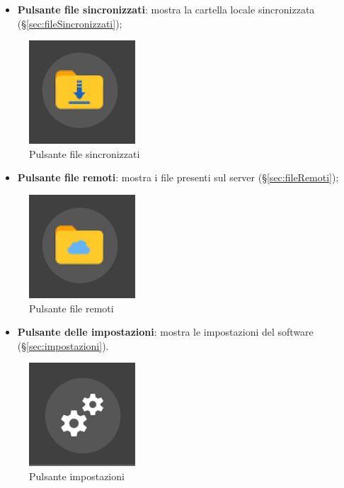 \begin{itemize}
\item \textbf{Pulsante file sincronizzati}: mostra la cartella locale sincronizzata (\S{}\ref{sec:fileSincronizzati}); \
\end{itemize}

\begin{figure}[H]
    \centering
    \includegraphics[scale = 1]{components/img/pulsanteFileS.png}
    \caption{Pulsante file sincronizzati}
    \label{fig:fileSync}
\end{figure}

\begin{itemize}
\item \textbf{Pulsante file remoti}: mostra i file presenti sul server (\S{}\ref{sec:fileRemoti}); \
\end{itemize}

\begin{figure}[H]
    \centering
    \includegraphics[scale = 1]{components/img/pulsanteFileR.png}
    \caption{Pulsante file remoti}
    \label{fig:fileRem}
\end{figure}

\begin{itemize}
\item \textbf{Pulsante delle impostazioni}: mostra le impostazioni del software (\S{}\ref{sec:impostazioni}). \
\end{itemize}

\begin{figure}[H]
    \centering
    \includegraphics[scale = 1]{components/img/pulsanteImpostazioni.png}
    \caption{Pulsante impostazioni}
    \label{fig:fileSync}
\end{figure}


